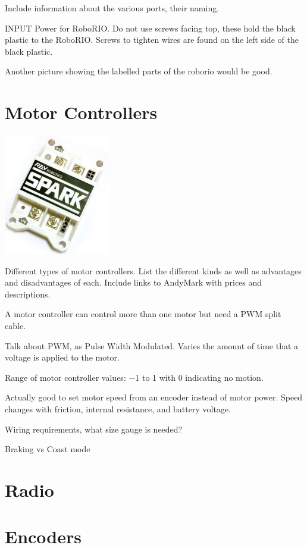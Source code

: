 \documentclass[letterpaper,10pt]{memoir}
\begin{document}
Include information about the various ports, their naming.

INPUT Power for RoboRIO. Do not use screws facing top, these hold the black plastic to the RoboRIO. Screws to tighten wires are found on the left side of the black plastic.

Another picture showing the labelled parts of the roborio would be good.


\newpage\section*{Motor Controllers}

\includegraphics[width=.25\textwidth]{images/spark}

Different types of motor controllers. List the different kinds as well as advantages and disadvantages of each. Include links to AndyMark with prices and descriptions.

A motor controller can control more than one motor but need a PWM split cable.

Talk about PWM, as Pulse Width Modulated. Varies the amount of time that a voltage is applied to the motor.

Range of motor controller values: \num{-1} to \num{1} with \num{0} indicating no motion.

Actually good to set motor speed from an encoder instead of motor power. Speed changes with friction, internal resistance, and battery voltage.

Wiring requirements, what size gauge is needed?

Braking vs Coast mode


\newpage\section*{Radio}





\newpage\section*{Encoders}
\end{document}
